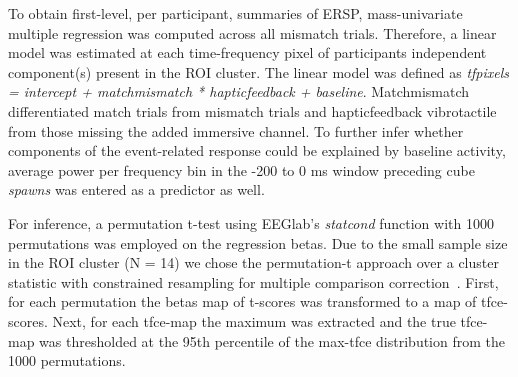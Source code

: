To obtain first-level, per participant, summaries of ERSP, mass-univariate multiple regression was computed across all mismatch trials. Therefore, a linear model was estimated at each time-frequency pixel of participants independent component(s) present in the ROI cluster. The linear model was defined as \textit{tf\textunderscore pixels = intercept + match\textunderscore mismatch * haptic\textunderscore feedback + baseline}. Match\textunderscore mismatch differentiated match trials from mismatch trials and haptic\textunderscore feedback vibrotactile from those missing the added immersive channel. To further infer whether components of the event-related response could be explained by baseline activity, average power per frequency bin in the -200 to 0 ms window preceding cube \textit{spawns} was entered as a predictor as well.


For inference, a permutation t-test using EEGlab's \textit{statcond} function with 1000 permutations was employed on the regression betas. Due to the small sample size in the ROI cluster (N = 14) we chose the permutation-t approach over a cluster statistic with constrained resampling for multiple comparison correction~\cite{Pernet2015}. First, for each permutation the betas map of t-scores was transformed to a map of tfce-scores. Next, for each tfce-map the maximum was extracted and the true tfce-map was thresholded at the 95th percentile of the max-tfce distribution from the 1000 permutations. 






